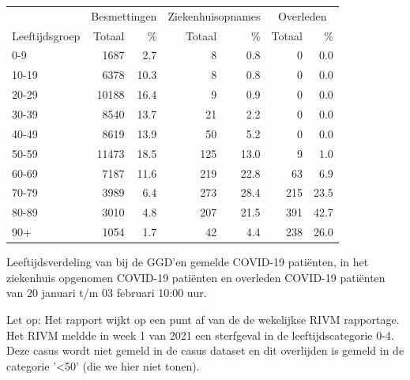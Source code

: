 \documentclass[
  english,
  man,floatsintext]{apa6}
\begin{document}
\begin{table}[H]
\centering\begingroup\fontsize{11}{13}\selectfont

\begin{threeparttable}
\begin{tabular}{lrrrrrr}
\toprule
\multicolumn{1}{c}{ } & \multicolumn{2}{c}{Besmettingen} & \multicolumn{2}{c}{Ziekenhuisopnames} & \multicolumn{2}{c}{Overleden} \\
\cmidrule(l{3pt}r{3pt}){2-3} \cmidrule(l{3pt}r{3pt}){4-5} \cmidrule(l{3pt}r{3pt}){6-7}
Leeftijdsgroep & Totaal & \% & Totaal & \% & Totaal & \%\\
\midrule
0-9 & 1687 & 2.7 & 8 & 0.8 & 0 & 0.0\\
10-19 & 6378 & 10.3 & 8 & 0.8 & 0 & 0.0\\
20-29 & 10188 & 16.4 & 9 & 0.9 & 0 & 0.0\\
30-39 & 8540 & 13.7 & 21 & 2.2 & 0 & 0.0\\
40-49 & 8619 & 13.9 & 50 & 5.2 & 0 & 0.0\\
50-59 & 11473 & 18.5 & 125 & 13.0 & 9 & 1.0\\
60-69 & 7187 & 11.6 & 219 & 22.8 & 63 & 6.9\\
70-79 & 3989 & 6.4 & 273 & 28.4 & 215 & 23.5\\
80-89 & 3010 & 4.8 & 207 & 21.5 & 391 & 42.7\\
90+ & 1054 & 1.7 & 42 & 4.4 & 238 & 26.0\\
\bottomrule
\end{tabular}
\begin{tablenotes}
\item[1] Leeftijdsverdeling van bij de GGD’en gemelde COVID-19 patiënten, in het ziekenhuis opgenomen COVID-19 patiënten en overleden COVID-19 patiënten van 20 januari t/m 03 februari 10:00 uur.
\item[2] Let op: Het rapport wijkt op een punt af van de de wekelijkse RIVM rapportage. Het RIVM meldde in week 1 van 2021 een sterfgeval in de leeftijdscategorie 0-4. Deze casus wordt niet gemeld in de casus dataset en dit overlijden is gemeld in de categorie '<50' (die we hier niet tonen).
\end{tablenotes}
\end{threeparttable}
\endgroup{}
\end{table}

\newpage
\end{document}
